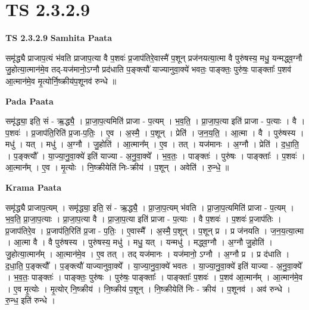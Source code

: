 \documentclass[17pt]{extarticle}
\begin{document}
\section{ TS 2.3.2.9 }

\textbf{TS 2.3.2.9 } \newline
\textbf{Samhita Paata} \newline

समृ॑द्ध्यै प्राजाप॒त्यं भ॑वति प्राजाप॒त्या वै प॒शवः॑ प्र॒जाप॑तिरे॒वास्मै॑ प॒शून् प्रज॑नयत्या॒त्मा वै पुरु॑षस्य॒ मधु॒ यन्मद्ध्व॒ग्नौ जु॒होत्या॒त्मान॑मे॒व तद्-यज॑मानो॒ऽग्नौ प्रद॑धाति प॒ङ्क्त्यौ॑ याज्यानुवा॒क्ये॑ भवतः॒ पाङ्क्तः॒ पुरु॑षः॒ पाङ्क्ताः᳚ प॒शव॑ आ॒त्मान॑मे॒व मृ॒त्योर्नि॒ष्क्रीय॑प॒शूनव॑ रुन्धे ॥ \newline

\textbf{Pada Paata} \newline

समृ॑द्ध्या॒ इति॒ सं - ऋ॒द्ध्यै॒ । प्रा॒जा॒प॒त्यमिति॑ प्राजा - प॒त्यम् । भ॒व॒ति॒ । प्रा॒जा॒प॒त्या इति॑ प्राजा - प॒त्याः । वै । प॒शवः॑ । प्र॒जाप॑ति॒रिति॑ प्र॒जा-प॒तिः॒ । ए॒व । अ॒स्मै॒ । प॒शून् । प्रेति॑ । ज॒न॒य॒ति॒ । आ॒त्मा । वै । पुरु॑षस्य । मधु॑ । यत् । मधु॑ । अ॒ग्नौ । जु॒होति॑ । आ॒त्मान᳚म् । ए॒व । तत् । यज॑मानः । अ॒ग्नौ । प्रेति॑ । द॒धा॒ति॒ । प॒ङ्क्त्यौ᳚ । या॒ज्या॒नु॒वा॒क्ये॑ इति॑ याज्या - अ॒नु॒वा॒क्ये᳚ । भ॒व॒तः॒ । पाङ्क्तः॑ । पुरु॑षः । पाङ्क्ताः᳚ । प॒शवः॑ । आ॒त्मान᳚म् । ए॒व । मृ॒त्योः । नि॒ष्क्रीयेति॑ निः-क्रीय॑ । प॒शून् । अवेति॑ । रु॒न्धे॒ ॥  \newline


\textbf{Krama Paata} \newline

समृ॑द्ध्यै प्राजाप॒त्यम् । समृ॑द्ध्या॒ इति॒ सं - ऋ॒द्ध्यै॒ । प्रा॒जा॒प॒त्यम् भ॑वति । प्रा॒जा॒प॒त्यमिति॑ प्राजा - प॒त्यम् । भ॒व॒ति॒ प्रा॒जा॒प॒त्याः । प्रा॒जा॒प॒त्या वै । प्रा॒जा॒प॒त्या इति॑ प्राजा - प॒त्याः । वै प॒शवः॑ । प॒शवः॑ प्र॒जाप॑तिः । प्र॒जाप॑तिरे॒व । प्र॒जाप॑ति॒रिति॑ प्र॒जा - प॒तिः॒ । ए॒वास्मै᳚ । अ॒स्मै॒ प॒शून् । प॒शून् प्र । प्र ज॑नयति । ज॒न॒य॒त्या॒त्मा । आ॒त्मा वै । वै पुरु॑षस्य । पुरु॑षस्य॒ मधु॑ । मधु॒ यत् । यन्मधु॑ । मद्ध्व॒ग्नौ । अ॒ग्नौ जु॒होति॑ । जु॒होत्या॒त्मान᳚म् । आ॒त्मान॑मे॒व । ए॒व तत् । तद् यज॑मानः । यज॑मानो॒ ऽग्नौ । अ॒ग्नौ प्र । प्र द॑धाति । द॒धा॒ति॒ प॒ङ्क्त्यौ᳚ । प॒ङ्क्त्यौ॑ याज्यानुवा॒क्ये᳚ । या॒ज्या॒नु॒वा॒क्ये॑ भवतः । या॒ज्या॒नु॒वा॒क्ये॑ इति॑ याज्या - अ॒नु॒वा॒क्ये᳚ । भ॒व॒तः॒ पाङ्क्तः॑ । पाङ्क्तः॒ पुरु॑षः । पुरु॑षः॒ पाङ्क्ताः᳚ । पाङ्क्ताः᳚ प॒शवः॑ । प॒शव॑ आ॒त्मान᳚म् । आ॒त्मान॑मे॒व । ए॒व मृ॒त्योः । मृ॒त्योर् नि॒ष्क्रीय॑ । नि॒ष्क्रीय॑ प॒शून् । नि॒ष्क्रीयेति॑ निः - क्रीय॑ । प॒शूनव॑ । अव॑ रुन्धे । रु॒न्ध॒ इति॑ रुन्धे । \newline
\end{document}
